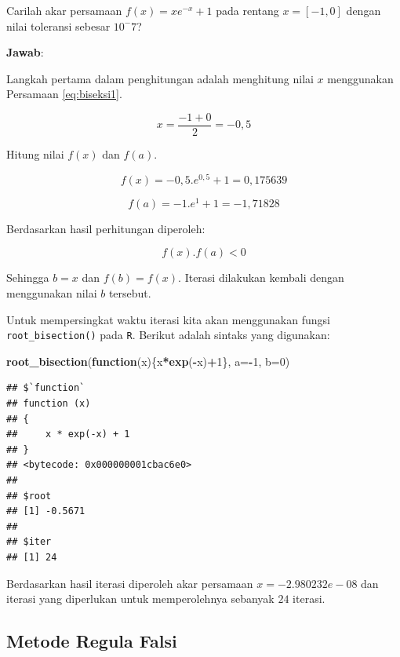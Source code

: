 \documentclass[]{book}
\newenvironment{Shaded}{\begin{snugshade}}{\end{snugshade}}
\newcommand{\ControlFlowTok}[1]{\textcolor[rgb]{0.13,0.29,0.53}{\textbf{#1}}}
\newcommand{\DataTypeTok}[1]{\textcolor[rgb]{0.13,0.29,0.53}{#1}}
\newcommand{\DecValTok}[1]{\textcolor[rgb]{0.00,0.00,0.81}{#1}}
\newcommand{\KeywordTok}[1]{\textcolor[rgb]{0.13,0.29,0.53}{\textbf{#1}}}
\newcommand{\NormalTok}[1]{#1}
\newcommand{\OperatorTok}[1]{\textcolor[rgb]{0.81,0.36,0.00}{\textbf{#1}}}
\theoremstyle{definition}
\theoremstyle{definition}
\theoremstyle{definition}
\theoremstyle{remark}
\let\BeginKnitrBlock\begin \let\EndKnitrBlock\end
\begin{document}
\BeginKnitrBlock{example}
\protect\hypertarget{exm:biseksexmp}{}{\label{exm:biseksexmp} }Carilah akar persamaan \(f\left(x \right)=xe^{-x}+1\) pada rentang \(x=\left[-1,0 \right]\) dengan nilai toleransi sebesar \(10^-7\)?
\EndKnitrBlock{example}

\textbf{Jawab}:

Langkah pertama dalam penghitungan adalah menghitung nilai \(x\) menggunakan Persamaan \eqref{eq:biseksi1}.

\[
x=\frac{-1+0}{2}=-0,5
\]

Hitung nilai \(f\left(x \right)\) dan \(f\left(a \right)\).

\[
f\left(x \right)=-0,5.e^{0,5}+1=0,175639
\]

\[
f\left(a \right)=-1.e^{1}+1=-1,71828
\]

Berdasarkan hasil perhitungan diperoleh:

\[
f\left(x \right).f\left(a \right)<0
\]

Sehingga \(b=x\) dan \(f\left(b \right)=f\left(x \right)\). Iterasi dilakukan kembali dengan menggunakan nilai \(b\) tersebut.

Untuk mempersingkat waktu iterasi kita akan menggunakan fungsi \texttt{root\_bisection()} pada \texttt{R}. Berikut adalah sintaks yang digunakan:

\begin{Shaded}
\begin{Highlighting}[]
\KeywordTok{root_bisection}\NormalTok{(}\ControlFlowTok{function}\NormalTok{(x)\{x}\OperatorTok{*}\KeywordTok{exp}\NormalTok{(}\OperatorTok{-}\NormalTok{x)}\OperatorTok{+}\DecValTok{1}\NormalTok{\},}
               \DataTypeTok{a=}\OperatorTok{-}\DecValTok{1}\NormalTok{, }\DataTypeTok{b=}\DecValTok{0}\NormalTok{)}
\end{Highlighting}
\end{Shaded}

\begin{verbatim}
## $`function`
## function (x) 
## {
##     x * exp(-x) + 1
## }
## <bytecode: 0x000000001cbac6e0>
## 
## $root
## [1] -0.5671
## 
## $iter
## [1] 24
\end{verbatim}

Berdasarkan hasil iterasi diperoleh akar persamaan \(x=-2.980232e-08\) dan iterasi yang diperlukan untuk memperolehnya sebanyak \(24\) iterasi.

\hypertarget{regulafalsi}{%
\subsection{Metode Regula Falsi}\label{regulafalsi}}
\end{document}
